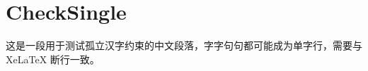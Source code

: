 \documentclass[a4paper,10pt,UTF8,scheme=chinese]{ctexart}
\begin{document}
\section{CheckSingle}
这是一段用于测试孤立汉字约束的中文段落，字字句句都可能成为单字行，需要与 XeLaTeX 断行一致。
\end{document}
